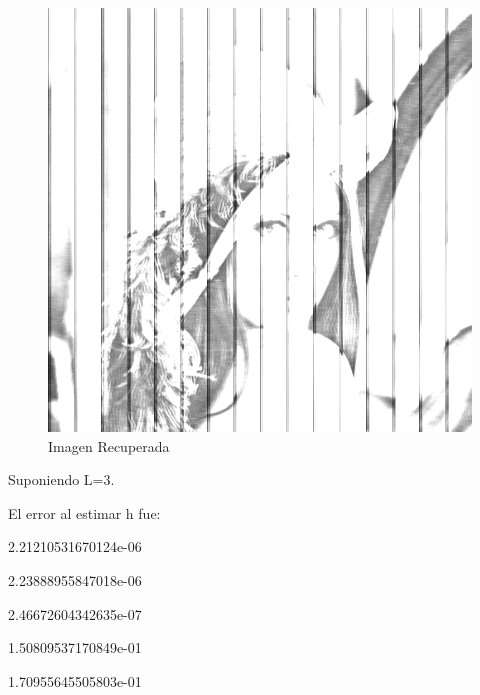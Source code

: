 \documentclass{article}
\begin{document}
\begin{multicols}{2}
\begin{figure}[H]
\end{figure}

\begin{figure}[H]
\centering
\includegraphics[scale=0.2]{../img/corrected_part3a.png}
\caption{Imagen Recuperada}

\end{figure}



\par \large{Suponiendo L=3.}
\par El error al estimar h fue:\\ 
\par   2.21210531670124e-06
\par   2.23888955847018e-06
\par   2.46672604342635e-07
\par   1.50809537170849e-01
\par   1.70955645505803e-01\\



\end{multicols}
\end{document}
